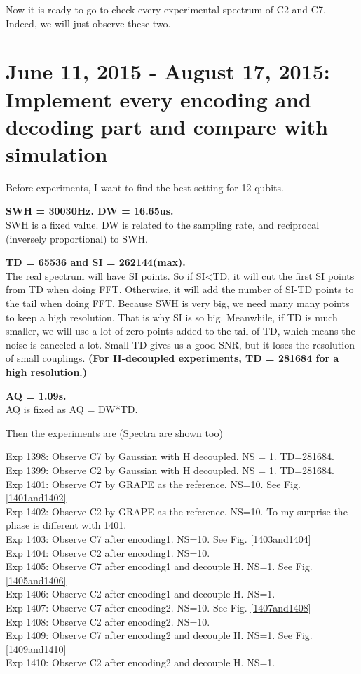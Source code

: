 \documentclass[prl,onecolumn]{revtex4-1}
\begin{document}
Now it is ready to go to check every experimental spectrum of C2 and C7. Indeed, we will just observe these two.

\clearpage
\section{June 11, 2015 - August 17, 2015: Implement every encoding and decoding part and compare with simulation}

Before experiments, I want to find the best setting for 12 qubits.

\textbf{SWH = 30030Hz. DW = 16.65us. }\\
SWH is a fixed value. DW is related to the sampling rate, and reciprocal (inversely proportional) to SWH.

\textbf{TD = 65536 and SI = 262144(max).} \\
The real spectrum will have SI points. So if SI<TD, it will cut the first SI points from TD when doing FFT. Otherwise, it will add the number of SI-TD points to the tail when doing FFT. Because SWH is very big, we need many many points to keep a high resolution. That is why SI is so big. Meanwhile, if TD is much smaller, we will use a lot of zero points added to the tail of TD, which means the noise is canceled a lot. Small TD gives us a good SNR, but it loses the resolution of small couplings.
\textbf{(For H-decoupled experiments, TD = 281684 for a high resolution.)}

\textbf{AQ = 1.09s.}\\
AQ is fixed as AQ = DW*TD.

Then the experiments are (Spectra are shown too)

Exp 1398: Observe C7 by Gaussian with H decoupled. NS = 1. TD=281684. \\
Exp 1399: Observe C2 by Gaussian with H decoupled. NS = 1. TD=281684. \\
Exp 1401: Observe C7 by GRAPE as the reference. NS=10. See Fig. \ref{1401and1402}\\
Exp 1402: Observe C2 by GRAPE as the reference. NS=10. To my surprise the phase is different with 1401.\\
Exp 1403: Observe C7 after encoding1. NS=10. See Fig. \ref{1403and1404}\\
Exp 1404: Observe C2 after encoding1. NS=10.\\
Exp 1405: Observe C7 after encoding1 and decouple H. NS=1. See Fig. \ref{1405and1406}\\
Exp 1406: Observe C2 after encoding1 and decouple H. NS=1.\\
Exp 1407: Observe C7 after encoding2. NS=10. See Fig. \ref{1407and1408}\\
Exp 1408: Observe C2 after encoding2. NS=10.\\
Exp 1409: Observe C7 after encoding2 and decouple H. NS=1. See Fig. \ref{1409and1410}\\
Exp 1410: Observe C2 after encoding2 and decouple H. NS=1.\\
\end{document}
